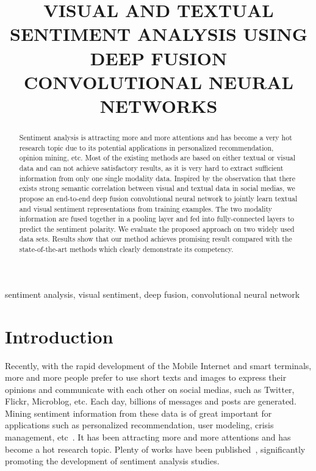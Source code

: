 \documentclass{article}
\title{VISUAL AND TEXTUAL SENTIMENT ANALYSIS USING DEEP FUSION CONVOLUTIONAL NEURAL NETWORKS}
\begin{document}
\maketitle
\begin{abstract}
Sentiment analysis is attracting more and more attentions and has become a very hot research topic due to its potential applications in personalized recommendation, opinion mining, etc. Most of the existing methods are based on either textual or visual data and can not achieve satisfactory results, as it is very hard to extract sufficient information from only one single modality data. Inspired by the observation that there exists strong semantic correlation between visual and textual data in social medias, we propose an end-to-end deep fusion convolutional neural network to jointly learn textual and visual sentiment representations from training examples. The two modality information are fused together in a pooling layer and fed into fully-connected layers to predict the sentiment polarity. We evaluate the proposed approach on two widely used data sets. Results show that our method achieves promising result compared with the state-of-the-art methods which clearly demonstrate its competency.
\end{abstract}
\begin{keywords}
sentiment analysis, visual sentiment, deep fusion, convolutional neural network
\end{keywords}


\section{Introduction}
\label{sec:intro}
\vspace{-0.1cm}
Recently, with the rapid development of the Mobile Internet and smart terminals, more and more people prefer to use short texts and images to express their opinions and communicate with each other on social medias, such as Twitter, Flickr, Microblog, etc. Each day, billions of messages and posts are generated. Mining sentiment information from these data is of great important for applications such as personalized recommendation, user modeling, crisis management, etc~\cite{Wu2016}. It has been attracting more and more attentions and has become a hot research topic. Plenty of works have been published~\cite{Wu2016, pang2008opinion, machajdik2010affective, you2015robust, wang2016beyond, ren2016context}, significantly promoting the development of sentiment analysis studies.
\end{document}
